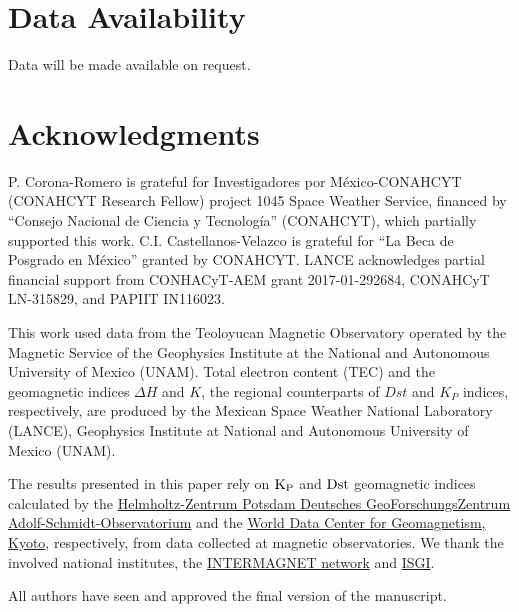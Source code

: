 \documentclass[a4paper,fleqn]{cas-dc}
\begin{document}
\section*{Data Availability}
\label{data_A}
Data will be made available on request.
\section*{Acknowledgments}
P. Corona-Romero is grateful for Investigadores por M\'exico-CONAHCYT (CONAHCYT Research Fellow) project 1045 Space Weather Service, financed by “Consejo Nacional de Ciencia y Tecnolog\'ia” (CONAHCYT), which partially supported this work. C.I. Castellanos-Velazco is grateful for “La Beca de Posgrado en M\'exico” granted by CONAHCYT. LANCE acknowledges partial financial support from 
CONHACyT-AEM grant 2017-01-292684, CONAHCyT LN-315829, and PAPIIT IN116023.

This work used data from the Teoloyucan Magnetic Observatory operated by the Magnetic Service of the Geophysics Institute at the National and Autonomous University of Mexico (UNAM). Total electron content (TEC) and the geomagnetic indices $\Delta H$ and $K$, the regional counterparts of $Dst$ and $K_P$ indices, respectively, are produced by the Mexican Space Weather National Laboratory (LANCE), Geophysics Institute at National and Autonomous University of Mexico (UNAM).

The results presented in this paper rely on ${\rm K_{P}}$ and ${\rm Dst}$ geomagnetic indices calculated by the \href{https://www.gfz-potsdam.de/en/kp-index}{Helmholtz-Zentrum Potsdam Deutsches GeoForschungsZentrum Adolf-Schmidt-Observatorium} and the \href{https://wdc.kugi.kyoto-u.ac.jp/}{World Data Center for Geomagnetism, Kyoto}, respectively, from data collected at magnetic observatories. We thank the involved national institutes, the \href{https://intermagnet.github.io/}{INTERMAGNET network} and \href{https://isgi.unistra.fr}{ISGI}.

All authors have seen and approved the final version of the manuscript.  


\label{Ack}
%




\bio{}
\endbio
\end{document}
